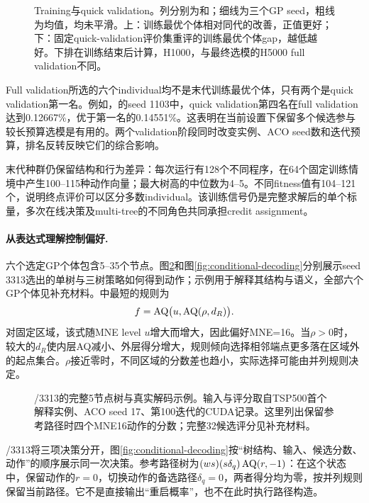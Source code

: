 \begin{figure}[tb]
\centering{}
\caption{Training与quick validation。列分别为\JS{}和\CT{}；细线为三个GP seed，粗线为均值，均未平滑。上：训练最优个体相对同代\Rsixteen{}的改善，正值更好；下：固定quick-validation评价集重评的训练最优个体gap，越低越好。下排在训练结束后计算，H1000，与最终选模的H5000 full validation不同。}
\label{fig:curves}
\end{figure}

Full validation所选的六个individual均不是末代训练最优个体，只有两个是quick validation第一名。例如，\JS{}的seed 1103中，quick validation第四名在full validation达到0.12667\%，优于第一名的0.14551\%。这表明在当前设置下保留多个候选参与较长预算选模是有用的。两个validation阶段同时改变实例、ACO seed数和迭代预算，排名反转反映它们的综合影响。

末代种群仍保留结构和行为差异：每次运行有128个不同程序，在64个固定训练情境中产生100--115种动作向量；最大树高的中位数为4--5。不同fitness值有104--121个，说明终点评价可以区分多数individual。该训练信号仍是完整求解后的单个标量，多次在线决策及multi-tree的不同角色共同承担credit assignment。

\paragraph{从表达式理解控制偏好.}
六个选定GP个体包含5--35个节点。图\ref{fig:decoding}和图\ref{fig:conditional-decoding}分别展示seed 3313选出的单树与三树策略如何得到动作；示例用于解释其结构与语义，全部六个GP个体见补充材料。\JS{}中最短的规则为
\begin{equation}
 f=\operatorname{AQ}\bigl(u,\operatorname{AQ}(\rho,d_R)\bigr).
 \label{eq:joint-rule}
\end{equation}
对固定区域，该式随MNE level $u$增大而增大，因此偏好MNE=16。当$\rho>0$时，较大的$d_R$使内层AQ减小、外层得分增大，规则倾向选择相邻端点更多落在区域外的起点集合。$\rho$接近零时，不同区域的分数差也趋小，实际选择可能由并列规则决定。

\begin{figure}[tb]
\centering

\caption{\JS{}/3313的完整5节点树与真实解码示例。输入与评分取自TSP500首个解释实例、ACO seed 17、第100迭代的CUDA记录。这里列出保留参考路径时四个MNE16动作的分数；完整32候选评分见补充材料。}
\label{fig:decoding}
\end{figure}

\CT{}/3313将三项决策分开，图\ref{fig:conditional-decoding}按“树结构、输入、候选分数、动作”的顺序展示同一次决策。参考路径树为$(ws)(s\delta_q)\operatorname{AQ}(r,-1)$：在这个状态中，保留动作的$r=0$，切换动作的备选路径$\delta_q=0$，两者得分均为零，按并列规则保留当前路径。它不是直接输出“重启概率”，也不在此时执行路径构造。

